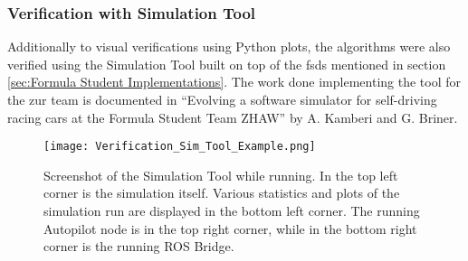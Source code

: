 \subsubsection{Verification with Simulation Tool} \label{sec:Verification with Simulation Tool}
Additionally to visual verifications using Python plots, the algorithms were also verified using the Simulation Tool built on top of the \acrlong{fsds} mentioned in section \ref{sec:Formula Student Implementations}. The work done implementing the tool for the \acrlong{zur} team is documented in ``Evolving a software simulator for self-driving racing cars at the Formula Student Team ZHAW'' by A. Kamberi and G. Briner. \cite{zur_sim_tool}
\begin{figure}[H]
    \centering
    \texttt{[image: Verification\_Sim\_Tool\_Example.png]}
    \caption{Screenshot of the Simulation Tool while running. In the top left corner is the simulation itself. Various statistics and plots of the simulation run are displayed in the bottom left corner. The running Autopilot node is in the top right corner, while in the bottom right corner is the running ROS Bridge.}
    \label{fig:Verification Sim Tool Example}
\end{figure}

